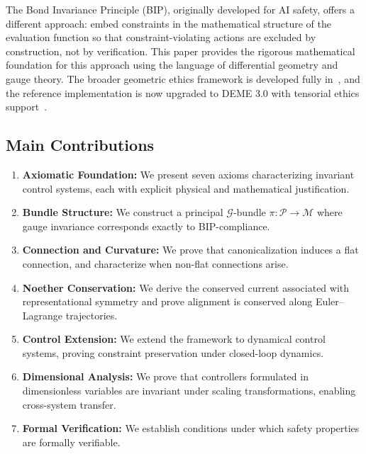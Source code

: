 \documentclass[11pt]{article}
\begin{document}
The Bond Invariance Principle (BIP), originally developed for AI safety, offers a different
approach: embed constraints in the mathematical structure of the evaluation function so that
constraint-violating actions are excluded by construction, not by verification. This paper provides
the rigorous mathematical foundation for this approach using the language of differential
geometry and gauge theory. The broader geometric ethics framework is developed fully in~\cite{bond2026ge}, and the reference implementation is now upgraded to DEME 3.0 with tensorial ethics support~\cite{bond2026erisml}.

\subsection{Main Contributions}

\begin{enumerate}
    \item \textbf{Axiomatic Foundation:} We present seven axioms characterizing invariant control systems, each with explicit physical and mathematical justification.

    \item \textbf{Bundle Structure:} We construct a principal $\mathcal{G}$-bundle $\pi : \mathcal{P} \to \mathcal{M}$ where gauge invariance corresponds exactly to BIP-compliance.

    \item \textbf{Connection and Curvature:} We prove that canonicalization induces a flat connection, and characterize when non-flat connections arise.

    \item \textbf{Noether Conservation:} We derive the conserved current associated with representational symmetry and prove alignment is conserved along Euler--Lagrange trajectories.

    \item \textbf{Control Extension:} We extend the framework to dynamical control systems, proving constraint preservation under closed-loop dynamics.

    \item \textbf{Dimensional Analysis:} We prove that controllers formulated in dimensionless variables are invariant under scaling transformations, enabling cross-system transfer.

    \item \textbf{Formal Verification:} We establish conditions under which safety properties are formally verifiable.
\end{enumerate}
\end{document}
